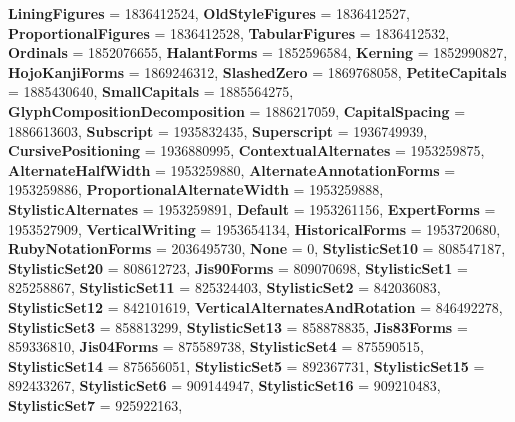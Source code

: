 \begin{DoxyCompactItemize}
\newline
{\bfseries Lining\+Figures} = 1836412524, 
{\bfseries Old\+Style\+Figures} = 1836412527, 
{\bfseries Proportional\+Figures} = 1836412528, 
{\bfseries Tabular\+Figures} = 1836412532, 
\newline
{\bfseries Ordinals} = 1852076655, 
{\bfseries Halant\+Forms} = 1852596584, 
{\bfseries Kerning} = 1852990827, 
{\bfseries Hojo\+Kanji\+Forms} = 1869246312, 
\newline
{\bfseries Slashed\+Zero} = 1869768058, 
{\bfseries Petite\+Capitals} = 1885430640, 
{\bfseries Small\+Capitals} = 1885564275, 
{\bfseries Glyph\+Composition\+Decomposition} = 1886217059, 
\newline
{\bfseries Capital\+Spacing} = 1886613603, 
{\bfseries Subscript} = 1935832435, 
{\bfseries Superscript} = 1936749939, 
{\bfseries Cursive\+Positioning} = 1936880995, 
\newline
{\bfseries Contextual\+Alternates} = 1953259875, 
{\bfseries Alternate\+Half\+Width} = 1953259880, 
{\bfseries Alternate\+Annotation\+Forms} = 1953259886, 
{\bfseries Proportional\+Alternate\+Width} = 1953259888, 
\newline
{\bfseries Stylistic\+Alternates} = 1953259891, 
{\bfseries Default} = 1953261156, 
{\bfseries Expert\+Forms} = 1953527909, 
{\bfseries Vertical\+Writing} = 1953654134, 
\newline
{\bfseries Historical\+Forms} = 1953720680, 
{\bfseries Ruby\+Notation\+Forms} = 2036495730, 
{\bfseries None} = 0, 
{\bfseries Stylistic\+Set10} = 808547187, 
\newline
{\bfseries Stylistic\+Set20} = 808612723, 
{\bfseries Jis90\+Forms} = 809070698, 
{\bfseries Stylistic\+Set1} = 825258867, 
{\bfseries Stylistic\+Set11} = 825324403, 
\newline
{\bfseries Stylistic\+Set2} = 842036083, 
{\bfseries Stylistic\+Set12} = 842101619, 
{\bfseries Vertical\+Alternates\+And\+Rotation} = 846492278, 
{\bfseries Stylistic\+Set3} = 858813299, 
\newline
{\bfseries Stylistic\+Set13} = 858878835, 
{\bfseries Jis83\+Forms} = 859336810, 
{\bfseries Jis04\+Forms} = 875589738, 
{\bfseries Stylistic\+Set4} = 875590515, 
\newline
{\bfseries Stylistic\+Set14} = 875656051, 
{\bfseries Stylistic\+Set5} = 892367731, 
{\bfseries Stylistic\+Set15} = 892433267, 
{\bfseries Stylistic\+Set6} = 909144947, 
\newline
{\bfseries Stylistic\+Set16} = 909210483, 
{\bfseries Stylistic\+Set7} = 925922163, 

\end{DoxyCompactItemize}
